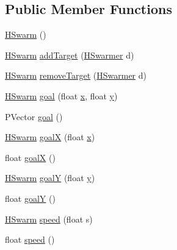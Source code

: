 \subsection*{Public Member Functions}
\begin{DoxyCompactItemize}
\item 
\hyperlink{classhype_1_1behavior_1_1_h_swarm_aab7c00c66ca06be3f58b5ec35c127848}{H\-Swarm} ()
\item 
\hyperlink{classhype_1_1behavior_1_1_h_swarm}{H\-Swarm} \hyperlink{classhype_1_1behavior_1_1_h_swarm_a4da8dafdeb5b92f0d532ecb649287cce}{add\-Target} (\hyperlink{interfacehype_1_1interfaces_1_1_h_swarmer}{H\-Swarmer} d)
\item 
\hyperlink{classhype_1_1behavior_1_1_h_swarm}{H\-Swarm} \hyperlink{classhype_1_1behavior_1_1_h_swarm_a3f0f157617f61465c03a3f27da1a929d}{remove\-Target} (\hyperlink{interfacehype_1_1interfaces_1_1_h_swarmer}{H\-Swarmer} d)
\item 
\hyperlink{classhype_1_1behavior_1_1_h_swarm}{H\-Swarm} \hyperlink{classhype_1_1behavior_1_1_h_swarm_a480fe88e67a16c4ae504f1000be300d6}{goal} (float \hyperlink{classhype_1_1behavior_1_1_h_swarm_ad7060f998f53a175ed64e5df951a58ff}{x}, float \hyperlink{classhype_1_1behavior_1_1_h_swarm_acdec5ccff50dc48e5f8e3f7124821c13}{y})
\item 
P\-Vector \hyperlink{classhype_1_1behavior_1_1_h_swarm_a3a49981d57643f6a44d4c4950ae99012}{goal} ()
\item 
\hyperlink{classhype_1_1behavior_1_1_h_swarm}{H\-Swarm} \hyperlink{classhype_1_1behavior_1_1_h_swarm_a0e862be7b79c0f199928bbfae78fc700}{goal\-X} (float \hyperlink{classhype_1_1behavior_1_1_h_swarm_ad7060f998f53a175ed64e5df951a58ff}{x})
\item 
float \hyperlink{classhype_1_1behavior_1_1_h_swarm_ade6a112c5cbc8771bc4e7234c4ba8427}{goal\-X} ()
\item 
\hyperlink{classhype_1_1behavior_1_1_h_swarm}{H\-Swarm} \hyperlink{classhype_1_1behavior_1_1_h_swarm_ac92924c164908426fd0577c170b79601}{goal\-Y} (float \hyperlink{classhype_1_1behavior_1_1_h_swarm_acdec5ccff50dc48e5f8e3f7124821c13}{y})
\item 
float \hyperlink{classhype_1_1behavior_1_1_h_swarm_aa6856445d5690d092ccabd57541969d0}{goal\-Y} ()
\item 
\hyperlink{classhype_1_1behavior_1_1_h_swarm}{H\-Swarm} \hyperlink{classhype_1_1behavior_1_1_h_swarm_a9ac59de039c931cf070a74b94f6843fe}{speed} (float s)
\item 
float \hyperlink{classhype_1_1behavior_1_1_h_swarm_a2087094e509d3051df8299ebfd864f42}{speed} ()

\end{DoxyCompactItemize}
